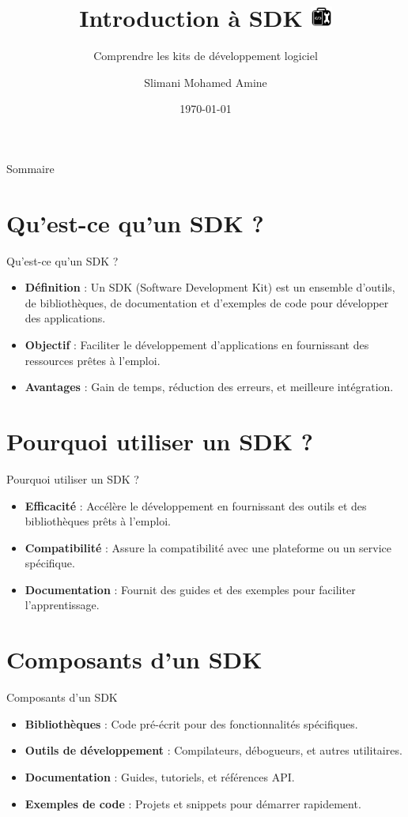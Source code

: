 \documentclass{clbeamer2024}
\title{
        Introduction à SDK
	\includegraphics[width=0.7cm]{logos/sdk.png} \hfill
}
\subtitle{Comprendre les kits de développement logiciel}
\author{Slimani Mohamed Amine}
\institute{EHTP}
\date{\today}
\begin{document}
	\setcounter{framenumber}{-1}
	\frame{\titlepage}
	
	
	
	\begin{frame}{Sommaire}
		\tableofcontents
	\end{frame}
	
	
	\section{Qu'est-ce qu'un SDK ?}
	\begin{frame}{Qu'est-ce qu'un SDK ?}
		\begin{itemize}
			\item \textbf{Définition} : Un SDK (Software Development Kit) est un ensemble d'outils, de bibliothèques, de documentation et d'exemples de code pour développer des applications.
			\item \textbf{Objectif} : Faciliter le développement d'applications en fournissant des ressources prêtes à l'emploi.
			\item \textbf{Avantages} : Gain de temps, réduction des erreurs, et meilleure intégration.
		\end{itemize}
	\end{frame}
 
 
 
 \section{Pourquoi utiliser un SDK ?}
 \begin{frame}{Pourquoi utiliser un SDK ?}
 	\begin{itemize}
 		\item \textbf{Efficacité} : Accélère le développement en fournissant des outils et des bibliothèques prêts à l'emploi.
 		\item \textbf{Compatibilité} : Assure la compatibilité avec une plateforme ou un service spécifique.
 		\item \textbf{Documentation} : Fournit des guides et des exemples pour faciliter l'apprentissage.
 	\end{itemize}
 \end{frame}
	
	
	\section{Composants d'un SDK}
	\begin{frame}{Composants d'un SDK}
		\begin{itemize}
			\item \textbf{Bibliothèques} : Code pré-écrit pour des fonctionnalités spécifiques.
			\item \textbf{Outils de développement} : Compilateurs, débogueurs, et autres utilitaires.
			\item \textbf{Documentation} : Guides, tutoriels, et références API.
			\item \textbf{Exemples de code} : Projets et snippets pour démarrer rapidement.
		\end{itemize}
	\end{frame}
	
\end{document}
